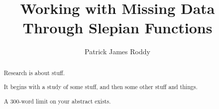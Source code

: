 
\title{Working with Missing Data Through Slepian Functions}
\author{Patrick James Roddy}

\maketitle
\makedeclaration{}

\begin{abstract} %
	Research is about stuff.

	It begins with a study of some stuff, and then some other stuff and things.

	A 300-word limit on your abstract exists.
\end{abstract}

